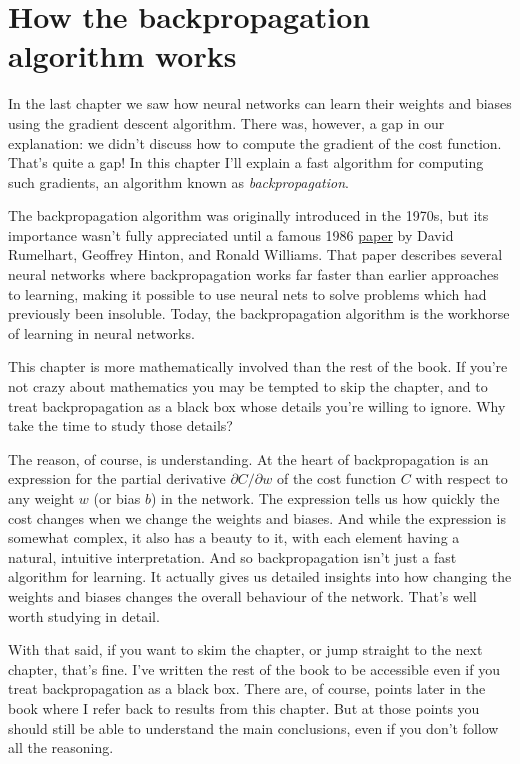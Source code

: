 \documentclass[a4paper,twoside,10pt]{book}
\begin{document}
\chapter{How the backpropagation algorithm works}
In the last chapter we saw how neural networks can learn their weights and biases using the gradient descent algorithm. There was, however, a gap in our explanation: we didn't discuss how to compute the gradient of the cost function. That's quite a gap! In this chapter I'll explain a fast algorithm for computing such gradients, an algorithm known as\textit{ backpropagation}.

The backpropagation algorithm was originally introduced in the 1970s, but its importance wasn't fully appreciated until a famous 1986 \href{http://www.nature.com/nature/journal/v323/n6088/pdf/323533a0.pdf}{paper} by David Rumelhart, Geoffrey Hinton, and Ronald Williams. That paper describes several neural networks where backpropagation works far faster than earlier approaches to learning, making it possible to use neural nets to solve problems which had previously been insoluble. Today, the backpropagation algorithm is the workhorse of learning in neural networks.

This chapter is more mathematically involved than the rest of the book. If you're not crazy about mathematics you may be tempted to skip the chapter, and to treat backpropagation as a black box whose details you're willing to ignore. Why take the time to study those details?

The reason, of course, is understanding. At the heart of backpropagation is an expression for the partial derivative $\partial{}C/\partial{}w$ of the cost function $C$ with respect to any weight $w$ (or bias $b$) in the network. The expression tells us how quickly the cost changes when we change the weights and biases. And while the expression is somewhat complex, it also has a beauty to it, with each element having a natural, intuitive interpretation. And so backpropagation isn't just a fast algorithm for learning. It actually gives us detailed insights into how changing the weights and biases changes the overall behaviour of the network. That's well worth studying in detail.

With that said, if you want to skim the chapter, or jump straight to the next chapter, that's fine. I've written the rest of the book to be accessible even if you treat backpropagation as a black box. There are, of course, points later in the book where I refer back to results from this chapter. But at those points you should still be able to understand the main conclusions, even if you don't follow all the reasoning.
\end{document}
